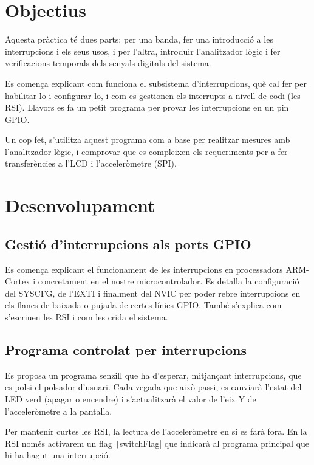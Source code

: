 
\section{Objectius}

Aquesta pràctica té dues parts: per una banda, fer una introducció a les interrupcions
i els seus usos, i per l'altra, introduir l'analitzador lògic i fer verificacions
temporals dels senyals digitals del sistema.

Es comença explicant com funciona el subsistema d'interrupcions, què cal fer per
habilitar-lo i configurar-lo, i com es gestionen els interrupts a nivell de codi (les RSI).
Llavors es fa un petit programa per provar les interrupcions en un pin GPIO.

Un cop fet, s'utilitza aquest programa com a base per realitzar mesures amb l'analitzador
lògic, i comprovar que es compleixen els requeriments per a fer transferències a l'LCD
i l'acceleròmetre (SPI).

\section{Desenvolupament}


\subsection{Gestió d'interrupcions als ports GPIO}

Es comença explicant el funcionament de les interrupcions en processadors ARM-Cortex
i concretament en el nostre microcontrolador. Es detalla la configuració del SYSCFG,
de l'EXTI i finalment del NVIC per poder rebre interrupcions en els flancs de baixada
o pujada de certes línies GPIO. També s'explica com s'escriuen les RSI i com les
crida el sistema.


\subsection{Programa controlat per interrupcions}

Es proposa un programa senzill que ha d'esperar, mitjançant interrupcions, que es polsi
el polsador d'usuari. Cada vegada que això passi, es canviarà l'estat del LED verd
(apagar o encendre) i s'actualitzarà el valor de l'eix Y de l'acceleròmetre a la pantalla.

Per mantenir curtes les RSI, la lectura de l'acceleròmetre en sí es farà fora.
En la RSI només activarem un flag \texttt|switchFlag| que indicarà al programa
principal que hi ha hagut una interrupció.

